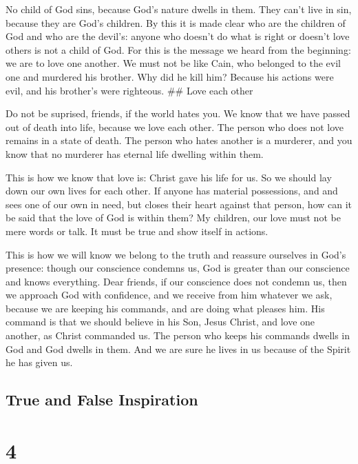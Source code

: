  No child of God sins, because God's nature dwells in them.
They can't live in sin, because they are God's children. 
By this it is made clear who are the children of God and who are the
devil's: anyone who doesn't do what is right or doesn't love others is
not a child of God.  For this is the message we heard from
the beginning: we are to love one another.  We must not be
like Cain, who belonged to the evil one and murdered his brother. Why
did he kill him? Because his actions were evil, and his brother's were
righteous. \#\# Love each other

 Do not be suprised, friends, if the world hates you.
 We know that we have passed out of death into life,
because we love each other. The person who does not love remains in a
state of death.  The person who hates another is a
murderer, and you know that no murderer has eternal life dwelling within
them.

 This is how we know that love is: Christ gave his life for
us. So we should lay down our own lives for each other.  If
anyone has material possessions, and and sees one of our own in need,
but closes their heart against that person, how can it be said that the
love of God is within them?  My children, our love must not
be mere words or talk. It must be true and show itself in actions.

 This is how we will know we belong to the truth and
reassure ourselves in God's presence:  though our
conscience condemns us, God is greater than our conscience and knows
everything.  Dear friends, if our conscience does not
condemn us, then we approach God with confidence,  and we
receive from him whatever we ask, because we are keeping his commands,
and are doing what pleases him.  His command is that we
should believe in his Son, Jesus Christ, and love one another, as Christ
commanded us.  The person who keeps his commands dwells in
God and God dwells in them. And we are sure he lives in us because of
the Spirit he has given us.

\hypertarget{true-and-false-inspiration}{%
\subsection{True and False
Inspiration}\label{true-and-false-inspiration}}

\hypertarget{section-3}{%
\section{4}\label{section-3}}

